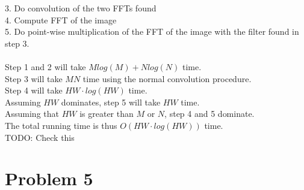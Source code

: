 \documentclass[11pt,psfig]{article}
\begin{document}
3. Do convolution of the two FFTs found\\
4. Compute FFT of the image\\
5. Do point-wise multiplication of the FFT of the image with the filter found in step 3. \\
\\
Step 1 and 2 will take $M log(M) + N log(N)$ time.  \\
Step 3 will take $MN$ time using the normal convolution procedure. \\
Step 4 will take $HW \cdot log(HW)$ time. \\
Assuming $HW$ dominates, step 5 will take $HW$ time. \\
Assuming that $HW$ is greater than $M$ or $N$, step 4 and 5 dominate. \\
The total running time is thus $O( HW \cdot log(HW) )$ time. \\
TODO: Check this

\newpage

\section*{Problem 5}
\end{document}
